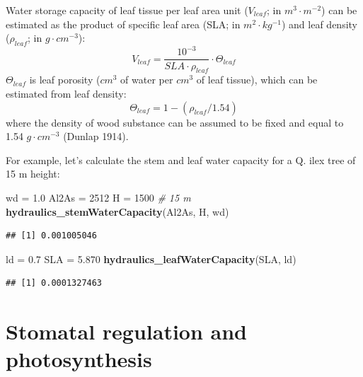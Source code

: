 \documentclass[]{book}
\newenvironment{Shaded}{\begin{snugshade}}{\end{snugshade}}
\newcommand{\KeywordTok}[1]{\textcolor[rgb]{0.13,0.29,0.53}{\textbf{#1}}}
\newcommand{\DecValTok}[1]{\textcolor[rgb]{0.00,0.00,0.81}{#1}}
\newcommand{\FloatTok}[1]{\textcolor[rgb]{0.00,0.00,0.81}{#1}}
\newcommand{\StringTok}[1]{\textcolor[rgb]{0.31,0.60,0.02}{#1}}
\newcommand{\CommentTok}[1]{\textcolor[rgb]{0.56,0.35,0.01}{\textit{#1}}}
\newcommand{\NormalTok}[1]{#1}
\begin{document}
Water storage capacity of leaf tissue per leaf area unit (\(V_{leaf}\); in \(m^3 \cdot m^{-2}\)) can be estimated as the product of specific leaf area (SLA; in \(m^2 \cdot kg^{-1}\)) and leaf density (\(\rho_{leaf}\); in \(g \cdot cm^{-3}\)):
\begin{equation}
V_{leaf} = \frac{10^{-3}}{SLA \cdot \rho_{leaf}} \cdot \Theta_{leaf}
\end{equation}
\(\Theta_{leaf}\) is leaf porosity (\(cm^3\) of water per \(cm^3\) of leaf tissue), which can be estimated from leaf density:
\begin{equation}
\Theta_{leaf} = 1 - (\rho_{leaf} / 1.54)
\end{equation}
where the density of wood substance can be assumed to be fixed and equal to 1.54 \(g \cdot cm^{-3}\) (Dunlap 1914).

For example, let's calculate the stem and leaf water capacity for a Q. ilex tree of 15 m height:

\begin{Shaded}
\begin{Highlighting}[]
\NormalTok{wd =}\StringTok{ }\FloatTok{1.0}
\NormalTok{Al2As =}\StringTok{ }\DecValTok{2512} 
\NormalTok{H =}\StringTok{ }\DecValTok{1500} \CommentTok{# 15 m}
\KeywordTok{hydraulics_stemWaterCapacity}\NormalTok{(Al2As, H, wd)}
\end{Highlighting}
\end{Shaded}

\begin{verbatim}
## [1] 0.001005046
\end{verbatim}

\begin{Shaded}
\begin{Highlighting}[]
\NormalTok{ld =}\StringTok{ }\FloatTok{0.7}
\NormalTok{SLA =}\StringTok{ }\FloatTok{5.870} 
\KeywordTok{hydraulics_leafWaterCapacity}\NormalTok{(SLA, ld)}
\end{Highlighting}
\end{Shaded}

\begin{verbatim}
## [1] 0.0001327463
\end{verbatim}

\hypertarget{stomatal-regulation-and-photosynthesis}{%
\section{Stomatal regulation and photosynthesis}\label{stomatal-regulation-and-photosynthesis}}
\end{document}
